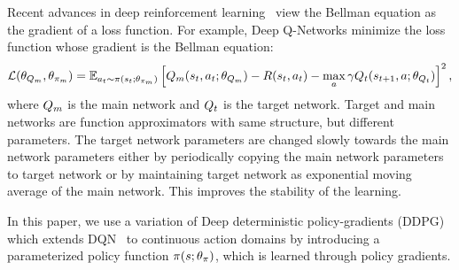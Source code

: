 Recent advances in deep reinforcement learning~\citep{MnKaSiNATURE2015} view the
Bellman equation as the gradient of a loss function. For example, Deep
Q-Networks minimize the loss function whose gradient is the Bellman equation:
%
\begin{align}
  \mathcal{L}(\theta_{Q_m}, \theta_{\pi_m}) = \mathbb{E}_{a_t\sim\pi(s_t; \theta_{\pi_m})}\left[
  Q_m(s_t, a_t; \theta_{Q_m}) -
  R(s_t, a_t) - \max_{a}\gamma Q_t(s_{t+1}, a; \theta_{Q_t}) \right]^2,
  \label{eq:bellman-dqn}
\end{align}
%
where $Q_m$ is the main network and $Q_t$ is the target network. Target and main
networks are function approximators with same structure, but different
parameters. The target network parameters are changed slowly towards the main
network parameters either by periodically copying the main network parameters to
target network or by maintaining target network as exponential moving average of
the main network. This improves the stability of the learning.


In this paper, we use a variation of
Deep deterministic policy-gradients (DDPG)~\citep{lillicrap2015continuous} which
extends DQN~\citep{MnKaSiNATURE2015} to continuous action domains by introducing
a parameterized policy function $\pi(s; \theta_\pi)$, which is
learned through policy gradients.



